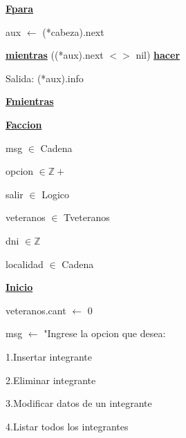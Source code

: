 \documentclass{article}
\begin{document}
        \hspace{12mm}\underline{\textbf{Fpara}}

        \hspace{12mm}aux $\leftarrow$ (*cabeza).next

        \hspace{12mm}\underline{\textbf{mientras}} ((*aux).next $<>$ nil) \underline{\textbf{hacer}}

            \hspace{16mm}Salida: (*aux).info

        \hspace{12mm}\underline{\textbf{Fmientras}}

    \hspace{4mm}\underline{\textbf{Faccion}}

    \vspace{4mm}

    \hspace{4mm}msg $\in$ Cadena

    \hspace{4mm}opcion $\in \mathbb{Z+}$

    \hspace{4mm}salir $\in$ Logico

    \hspace{4mm}veteranos $\in$ Tveteranos

    \hspace{4mm}dni $\in \mathbb{Z}$

    \hspace{4mm}localidad $\in$ Cadena

    \vspace{4mm}

    \underline{\textbf{Inicio}}

    \hspace{4mm}veteranos.cant $\leftarrow$ 0

    \hspace{4mm}msg $\leftarrow$ "Ingrese la opcion que desea: 

        \hspace{17mm}1.Insertar integrante

        \hspace{17mm}2.Eliminar integrante

        \hspace{17mm}3.Modificar datos de un integrante

        \hspace{17mm}4.Listar todos los integrantes
\end{document}
